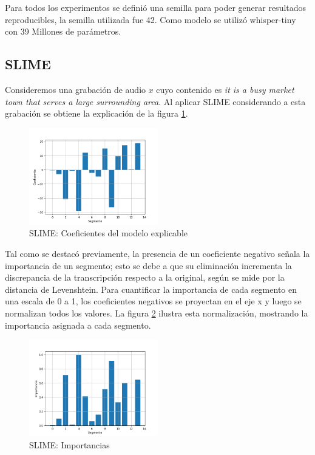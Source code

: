 \documentclass[conference]{IEEEtran}
\begin{document}
Para todos los experimentos se definió una semilla para poder generar resultados reproducibles, la semilla utilizada fue 42.
Como modelo se utilizó whisper-tiny con 39 Millones de parámetros.

\subsection{SLIME}

Consideremos una grabación de audio $x$ cuyo contenido es \textit{it is a busy market town that serves a large surrounding area}. Al aplicar SLIME considerando a esta grabación se obtiene la explicación de la figura \ref{fig:coefficients}.

\begin{figure}[ht]
\centerline{\includegraphics[width=0.5\textwidth]{./images/coefficients.png}}
\caption{SLIME: Coeficientes del modelo explicable}
\label{fig:coefficients}
\end{figure}

Tal como se destacó previamente, la presencia de un coeficiente negativo señala la importancia de un segmento; esto se debe a que su eliminación incrementa la discrepancia de la transcripción respecto a la original, según se mide por la distancia de Levenshtein. Para cuantificar la importancia de cada segmento en una escala de 0 a 1, los coeficientes negativos se proyectan en el eje x y luego se normalizan todos los valores. La figura \ref{fig:importance} ilustra esta normalización, mostrando la importancia asignada a cada segmento.

\begin{figure}[ht]
\centerline{\includegraphics[width=0.5\textwidth]{./images/slime.png}}
\caption{SLIME: Importancias}
\label{fig:importance}
\end{figure}
\end{document}
